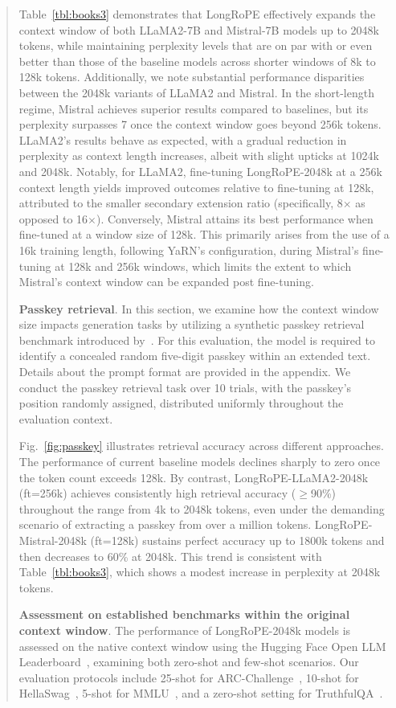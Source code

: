 \begin{abstract}
Table~\ref{tbl:books3} demonstrates that LongRoPE effectively expands the context window of both LLaMA2-7B and Mistral-7B models up to 2048k tokens, while maintaining perplexity levels that are on par with or even better than those of the baseline models across shorter windows of 8k to 128k tokens. Additionally, we note substantial performance disparities between the 2048k variants of LLaMA2 and Mistral. In the short-length regime, Mistral achieves superior results compared to baselines, but its perplexity surpasses 7 once the context window goes beyond 256k tokens. LLaMA2's results behave as expected, with a gradual reduction in perplexity as context length increases, albeit with slight upticks at 1024k and 2048k. Notably, for LLaMA2, fine-tuning LongRoPE-2048k at a 256k context length yields improved outcomes relative to fine-tuning at 128k, attributed to the smaller secondary extension ratio (specifically, 8$\times$ as opposed to 16$\times$). Conversely, Mistral attains its best performance when fine-tuned at a window size of 128k. This primarily arises from the use of a 16k training length, following YaRN's configuration, during Mistral's fine-tuning at 128k and 256k windows, which limits the extent to which Mistral’s context window can be expanded post fine-tuning.

\textbf{Passkey retrieval}. In this section, we examine how the context window size impacts generation tasks by utilizing a synthetic passkey retrieval benchmark introduced by~\cite{passkey}. For this evaluation, the model is required to identify a concealed random five-digit passkey within an extended text. Details about the prompt format are provided in the appendix. We conduct the passkey retrieval task over 10 trials, with the passkey’s position randomly assigned, distributed uniformly throughout the evaluation context.

Fig.~\ref{fig:passkey} illustrates retrieval accuracy across different approaches. The performance of current baseline models declines sharply to zero once the token count exceeds 128k. By contrast, LongRoPE-LLaMA2-2048k (ft=256k) achieves consistently high retrieval accuracy ($\ge$90\%) throughout the range from 4k to 2048k tokens, even under the demanding scenario of extracting a passkey from over a million tokens. LongRoPE-Mistral-2048k (ft=128k) sustains perfect accuracy up to 1800k tokens and then decreases to 60\% at 2048k. This trend is consistent with Table~\ref{tbl:books3}, which shows a modest increase in perplexity at 2048k tokens.

\textbf{Assessment on established benchmarks within the original context window}. The performance of LongRoPE-2048k models is assessed on the native context window using the Hugging Face Open LLM Leaderboard~\cite{huggingfaceboard}, examining both zero-shot and few-shot scenarios. Our evaluation protocols include 25-shot for ARC-Challenge~\cite{allenai:arc}, 10-shot for HellaSwag~\cite{zellers2019hellaswag}, 5-shot for MMLU~\cite{mmlu}, and a zero-shot setting for TruthfulQA~\cite{lin2021truthfulqa}.


\end{abstract}
